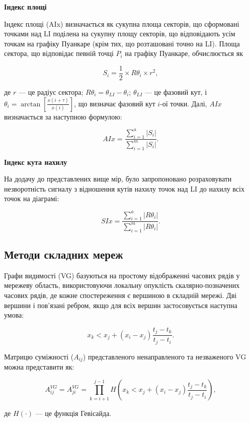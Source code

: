 \documentclass[
  letterpaper,
]{report}
\begin{document}
\textbf{Індекс площі}

Індекс площі (AIx) визначається як сукупна площа секторів, що сформовані
точками над LI поділена на сукупну площу секторів, що відповідають усім
точкам на графіку Пуанкаре (крім тих, що розташовані точно на LI). Площа
сектора, що відповідає певній точці \(P_{i}\) на графіку Пуанкаре,
обчислюється як

\[ 
S_{i} = \frac{1}{2} \times R\theta_{i} \times r^{2}, 
\]

де \(r\) --- це радіус сектора;
\(R\theta_{i} = \theta_{LI} - \theta_{i}\); \(\theta_{LI}\) --- це
фазовий кут, і
\(\theta_{i} = \arctan{\left[ \frac{x(i+\tau)}{x(i)} \right]}\), що
визначає фазовий кут \(i\)-ої точки. Далі, \(AIx\) визначається за
наступною формулою:

\[ 
AIx = \frac{\sum_{i=1}^{a}|S_{i}|}{\sum_{i=1}^{m}|S_{i}|}. 
\]

\textbf{Індекс кута нахилу}

На додачу до представлених вище мір, було запропоновано розраховувати
незворотність сигналу з відношення кутів нахилу точок над LI до нахилу
всіх точок на діаграмі:

\[ 
SIx = \frac{\sum_{i=1}^{a}|R\theta_{i}|}{\sum_{i=1}^{m}|R\theta_{i}|}. 
\]

\hypertarget{ux43cux435ux442ux43eux434ux438-ux441ux43aux43bux430ux434ux43dux438ux445-ux43cux435ux440ux435ux436}{%
\subsection{Методи складних
мереж}\label{ux43cux435ux442ux43eux434ux438-ux441ux43aux43bux430ux434ux43dux438ux445-ux43cux435ux440ux435ux436}}

Графи видимості (VG) базуються на простому відображенні часових рядів у
мережеву область, використовуючи локальну опуклість скалярно-позначених
часових рядів, де кожне спостереження є вершиною в складній мережі. Дві
вершини і пов'язані ребром, якщо для всіх вершин застосовується наступна
умова:

\[ 
x_{k} < x_{j} + \left( x_{i} - x_{j} \right) \frac{t_{j}-t_{k}}{t_{j}-t_{i}}. 
\]

Матрицю суміжності (\(A_{ij}\)) представленого ненаправленого та
незваженого VG можна представити як:

\[ 
A_{ij}^{VG} = A_{ji}^{VG} = \prod_{k=i+1}^{j-1} H \left( x_{k} < x_{j} + \left( x_{i} - x_{j} \right) \frac{t_{j}-t_{k}}{t_{j}-t_{i}} \right), 
\]

де \(H( \cdot )\) --- це функція Гевісайда.
\end{document}
